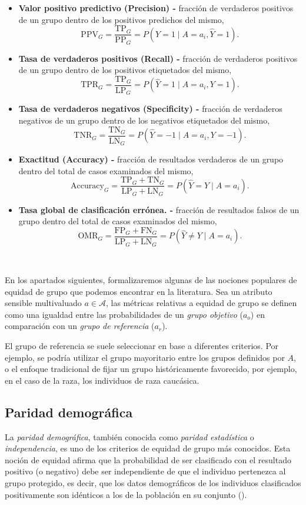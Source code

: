 \documentclass[oneside,openright,titlepage,numbers=noenddot,openany,headinclude,footinclude=true,
cleardoublepage=empty,abstractoff,BCOR=5mm,paper=a4,fontsize=12pt,main=spanish]{scrreprt}
\begin{document}
\begin{itemize}
    \item \textbf{Valor positivo predictivo (Precision) -} fracción de verdaderos positivos de un grupo dentro de los positivos predichos del mismo, $$\text{PPV}_G = \frac{\text{TP}_G}{\text{PP}_G} = P(Y=1 \mid A=a_i,\hat{Y}=1).$$
    \item \textbf{Tasa de verdaderos positivos (Recall) -} fracción de verdaderos positivos de un grupo dentro de los positivos etiquetados del mismo, $$\text{TPR}_G = \frac{\text{TP}_G}{\text{LP}_G} = P(\hat{Y}=1 \mid A=a_i,Y=1).$$
    \item \textbf{Tasa de verdaderos negativos (Specificity) -} fracción de verdaderos negativos de un grupo dentro de los negativos etiquetados del mismo, $$\text{TNR}_G = \frac{\text{TN}_G}{\text{LN}_G} = P(\hat{Y}=-1 \mid A=a_i,Y=-1).$$
    \item \textbf{Exactitud (Accuracy) -} fracción de resultados verdaderos de un grupo dentro del total de casos examinados del mismo, $$\text{Accuracy}_G = \frac{\text{TP}_G+\text{TN}_G}{\text{LP}_G+\text{LN}_G} = P(\hat{Y}=Y \mid A=a_i).$$
    \item \textbf{Tasa global de clasificación errónea. -} fracción de resultados falsos de un grupo dentro del total de casos examinados del mismo, $$\text{OMR}_G = \frac{\text{FP}_G+\text{FN}_G}{\text{LP}_G+\text{LN}_G} = P(\hat{Y}\neq Y \mid A=a_i).$$
\end{itemize}\

En los apartados siguientes, formalizaremos algunas de las nociones populares de equidad de grupo que podemos encontrar en la literatura. Sea un atributo sensible multivaluado $a\in \mathcal{A}$, las métricas relativas a equidad de grupo se definen como una igualdad entre las probabilidades de un \textit{grupo objetivo} ($a_o$) en comparación con un \textit{grupo de referencia} ($a_r$).

El grupo de referencia se suele seleccionar en base a diferentes criterios. Por ejemplo, se podría utilizar el grupo mayoritario entre los grupos definidos por $A$, o el enfoque
tradicional de fijar un grupo históricamente favorecido, por ejemplo, en el caso de la raza, los individuos de raza caucásica.


\subsection{Paridad demográfica}

La \textit{paridad demográfica}, también conocida como \textit{paridad estadística} o \textit{independencia}, es uno de los criterios de equidad de grupo más conocidos. Esta noción de equidad afirma que la probabilidad de ser clasificado con el resultado positivo (o negativo) debe ser independiente de que el individuo pertenezca al grupo protegido, es decir, que los datos demográficos de los individuos clasificados positivamente son idénticos a los de la población en su conjunto (\cite{detect2012}).\\
\end{document}
